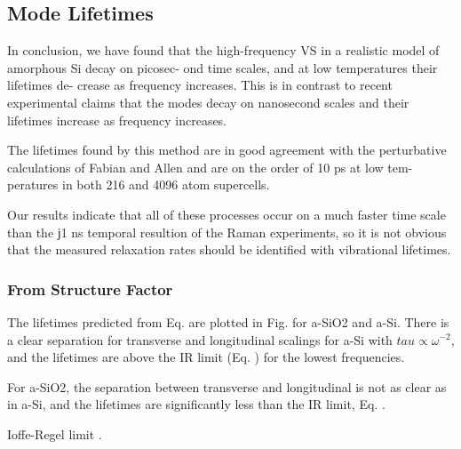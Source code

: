\documentclass[aps,prb,twocolumn,superscriptaddress,footinbib,amsmath,amssymb,floatfix]{revtex4}
\begin{document}

\subsection{\label{S:Life}Mode Lifetimes}

In conclusion, we have found that the high-frequency
VS in a realistic model of amorphous Si decay on picosec-
ond time scales, and at low temperatures their lifetimes de-
crease as frequency increases. This is in contrast to recent
experimental claims that the modes decay on nanosecond
scales and their lifetimes increase as frequency increases.
\cite{fabian_anharmonic_1996} 

The lifetimes found by this method
are in good agreement with the perturbative calculations of
Fabian and Allen and are on the order of 10 ps at low tem-
peratures in both 216 and 4096 atom supercells.
\cite{bickham_calculation_1998}

Our results indicate that all of
these processes occur on a much faster time scale than the
ϳ1 ns temporal resultion of the Raman experiments, so it is
not obvious that the measured relaxation rates should be
identified with vibrational lifetimes.
\cite{bickham_numerical_1999}


\subsubsection{\label{S:Life_SF}From Structure Factor}

The lifetimes predicted from Eq. are plotted in Fig. for a-SiO2 and a-Si. 
There is a clear separation for transverse and longitudinal scalings 
for a-Si with $tau \propto \omega^{-2}$, and the lifetimes are above the 
IR limit (Eq. ) for the lowest frequencies. 

For a-SiO2, the separation between transverse and longitudinal is not 
as clear as in a-Si, and the lifetimes are significantly less than the 
IR limit, Eq. .  

Ioffe-Regel limit \cite{taraskin_determination_1999}.
\end{document}
